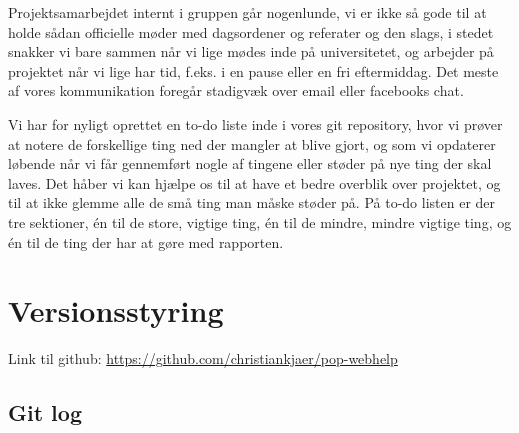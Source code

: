 \documentclass[11pt, a4paper]{article}
\begin{document}
Projektsamarbejdet internt i gruppen går nogenlunde, vi er ikke så gode til at holde sådan officielle møder  med dagsordener og referater og den slags, i stedet snakker vi bare sammen når vi lige mødes inde på universitetet, og arbejder på projektet når vi lige har tid, f.eks. i en pause eller en fri eftermiddag. Det meste af vores kommunikation foregår stadigvæk over email eller facebooks chat.

Vi har for nyligt oprettet en to-do liste inde i vores git repository, hvor vi prøver at notere de forskellige ting ned der mangler at blive gjort, og som vi opdaterer løbende når vi får gennemført nogle af tingene eller støder på nye ting der skal laves. Det håber vi kan hjælpe os til at have et bedre overblik over projektet, og til at ikke glemme alle de små ting man måske støder på. På to-do listen er der tre sektioner, én til de store, vigtige ting, én til de mindre, mindre vigtige ting, og én til de ting der har at gøre med rapporten.

\newpage
\appendix
\section{Versionsstyring}
\label{sec:versionsstyring}

Link til github: \url{https://github.com/christiankjaer/pop-webhelp}

\subsection{Git log}
\label{sub:git_log}

\end{document}
